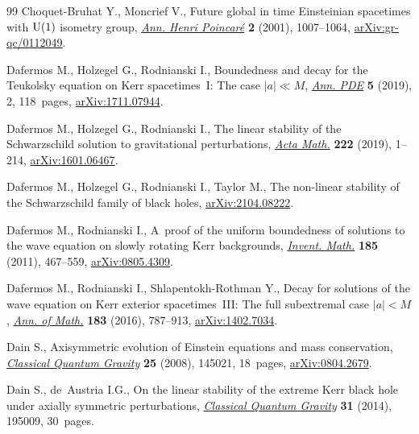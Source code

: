 \documentclass[11pt]{article}
\numberwithin{equation}{section}
\numberwithin{equation}{section}
\begin{document}
\begin{thebibliography}{99}
Choquet-Bruhat Y., Moncrief V., Future global in time {E}insteinian spacetimes
 with {${\rm U}(1)$} isometry group,
 \href{https://doi.org/10.1007/s00023-001-8602-5}{\textit{Ann. Henri
 Poincar\'e}} \textbf{2} (2001), 1007--1064,
 \href{http://arxiv.org/abs/gr-qc/0112049}{arXiv:gr-qc/0112049}.

Dafermos M., Holzegel G., Rodnianski I., Boundedness and decay for the
 {T}eukolsky equation on {K}err spacetimes~{I}: {T}he case {$|a|\ll M$},
 \href{https://doi.org/10.1007/s40818-018-0058-8}{\textit{Ann. PDE}}
 \textbf{5} (2019), 2, 118~pages,
 \href{http://arxiv.org/abs/1711.07944}{arXiv:1711.07944}.

Dafermos M., Holzegel G., Rodnianski I., The linear stability of the
 {S}chwarzschild solution to gravitational perturbations,
 \href{https://doi.org/10.4310/ACTA.2019.v222.n1.a1}{\textit{Acta Math.}}
 \textbf{222} (2019), 1--214,
 \href{http://arxiv.org/abs/1601.06467}{arXiv:1601.06467}.

Dafermos M., Holzegel G., Rodnianski I., Taylor M., The non-linear stability of
 the {S}chwarzschild family of black holes,
 \href{http://arxiv.org/abs/2104.08222}{arXiv:2104.08222}.

Dafermos M., Rodnianski I., A~proof of the uniform boundedness of solutions to
 the wave equation on slowly rotating {K}err backgrounds,
 \href{https://doi.org/10.1007/s00222-010-0309-0}{\textit{Invent. Math.}}
 \textbf{185} (2011), 467--559,
 \href{http://arxiv.org/abs/0805.4309}{arXiv:0805.4309}.

Dafermos M., Rodnianski I., Shlapentokh-Rothman Y., Decay for solutions of the
 wave equation on {K}err exterior spacetimes~{III}: {T}he full subextremal
 case {$|a|<M$},
 \href{https://doi.org/10.4007/annals.2016.183.3.2}{\textit{Ann. of Math.}}
 \textbf{183} (2016), 787--913,
 \href{http://arxiv.org/abs/1402.7034}{arXiv:1402.7034}.

Dain S., Axisymmetric evolution of {E}instein equations and mass conservation,
 \href{https://doi.org/10.1088/0264-9381/25/14/145021}{\textit{Classical
 Quantum Gravity}} \textbf{25} (2008), 145021, 18~pages,
 \href{http://arxiv.org/abs/0804.2679}{arXiv:0804.2679}.

Dain S., de~Austria I.G., On the linear stability of the extreme {K}err black
 hole under axially symmetric perturbations,
 \href{https://doi.org/10.1088/0264-9381/31/19/195009}{\textit{Classical
 Quantum Gravity}} \textbf{31} (2014), 195009, 30~pages.


\end{thebibliography}
\end{document}

